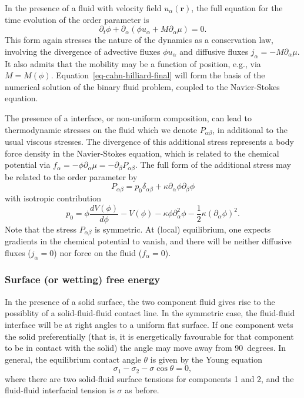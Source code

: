In the presence of a fluid with velocity field $u_\alpha(\mathbf{r})$,
the full equation for the time evolution of the order parameter is
\begin{equation}
\partial_t \phi + \partial_\alpha (\phi u_\alpha + M\partial_\alpha \mu) = 0.
\label{eq-cahn-hilliard-final}
\end{equation}
This form again stresses the nature of the dynamics as a conservation law,
involving the divergence of advective fluxes $\phi u_\alpha$ and diffusive
fluxes $j_\alpha = -M\partial_\alpha \mu$. It
also admits that the mobility may be a function of position, e.g., via
$M = M(\phi)$. Equation~\ref{eq-cahn-hilliard-final} will form the basis of
the numerical solution of the binary fluid problem, coupled to the
Navier-Stokes equation.

The presence of a interface, or non-uniform composition, can lead to
thermodynamic stresses on the fluid which we denote $P_{\alpha\beta}$,
in additional to the usual viscous
stresses. The divergence of this
additional stress represents a body force density in the Navier-Stokes
equation, which is related to the chemical potential via
$f_\alpha = -\phi\partial_\alpha \mu = -\partial_\beta P_{\alpha\beta}$.
The full form of the additional stress may be related to the order
parameter by
\begin{equation}
P_{\alpha\beta} = p_0 \delta_{\alpha\beta}
  + \kappa \partial_\alpha \phi \partial_\beta \phi
\end{equation}
with isotropic contribution
\begin{equation}
p_0 = \phi \frac{dV(\phi)}{d\phi} -  V(\phi)
-\kappa\phi\partial_\alpha^2 \phi - \textstyle{\frac{1}{2}} \kappa (\partial_\alpha \phi)^2.
\end{equation}
Note that the stress $P_{\alpha\beta}$ is symmetric. At (local) equilibrium,
one expects gradients in the chemical potential to vanish,
and there will be neither diffusive fluxes ($j_\alpha = 0$) nor force on
the fluid ($f_\alpha = 0$).

\subsubsection{Surface (or wetting) free energy}

In the presence of a solid surface, the two component fluid gives
rise to the possiblity of a solid-fluid-fluid contact line. In the
symmetric case, the fluid-fluid interface will be at right angles to
a uniform flat surface. If one component wets the solid preferentially
(that is, it is energetically favourable for that component to be
in contact with the solid) the angle may move away from
90~degrees.
In general, the equilibrium contact angle $\theta$ is given by the
Young equation
\begin{equation}
\sigma_1 - \sigma_2 - \sigma \cos\theta = 0,
\end{equation}
where there are two solid-fluid surface tensions for components 1 and 2,
and the fluid-fluid interfacial tension is $\sigma$ as before.


